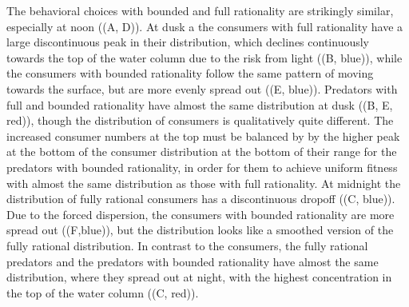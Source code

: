 The behavioral choices with bounded and full rationality are strikingly similar, especially at noon ((A, D)). At dusk a the consumers with full rationality have a large discontinuous peak in their distribution, which declines continuously towards the top of the water column due to the risk from light ((B, blue)), while the consumers with bounded rationality follow the same pattern of moving towards the surface, but are more evenly spread out ((E, blue)). Predators with full and bounded rationality have almost the same distribution at dusk ((B, E, red)), though the distribution of consumers is qualitatively quite different. The increased consumer numbers at the top must be balanced by by the higher peak at the bottom of the consumer distribution at the bottom of their range for the predators with bounded rationality, in order for them to achieve uniform fitness with almost the same distribution as those with full rationality.
At midnight the distribution of fully rational consumers has a discontinuous dropoff ((C, blue)). Due to the forced dispersion, the consumers with bounded rationality are more spread out ((F,blue)), but the distribution looks like a smoothed version of the fully rational distribution.
In contrast to the consumers, the fully rational predators and the predators with bounded rationality have almost the same distribution, where they spread out at night, with the highest concentration in the top of the water column ((C, red)).





